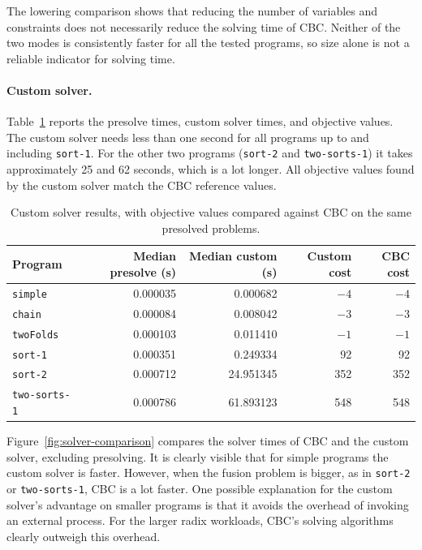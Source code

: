 The lowering comparison shows that reducing the number of variables and constraints does not necessarily reduce the solving time of CBC.
Neither of the two modes is consistently faster for all the tested programs, so size alone is not a reliable indicator for solving time.

\FloatBarrier
\paragraph{Custom solver.}

Table~\ref{tab:custom-results} reports the presolve times, custom solver times, and objective values.
The custom solver needs less than one second for all programs up to and including \texttt{sort-1}.
For the other two programs (\texttt{sort-2} and \texttt{two-sorts-1}) it takes approximately 25 and 62 seconds, which is a lot longer.
All objective values found by the custom solver match the CBC reference values.

\begin{table}[htbp]
    \centering
    \small
    \begin{tabular}{lrrrr}
        \hline
        Program & Median presolve (s) & Median custom (s)
                & Custom cost & CBC cost \\
        \hline
        \texttt{simple}      & 0.000035 & 0.000682  & $-4$ & $-4$ \\
        \texttt{chain}       & 0.000084 & 0.008042  & $-3$ & $-3$ \\
        \texttt{twoFolds}    & 0.000103 & 0.011410  & $-1$ & $-1$ \\
        \texttt{sort-1}      & 0.000351 & 0.249334  & 92   & 92 \\
        \texttt{sort-2}      & 0.000712 & 24.951345 & 352  & 352 \\
        \texttt{two-sorts-1} & 0.000786 & 61.893123 & 548  & 548 \\
        \hline
    \end{tabular}
    \caption{Custom solver results, with objective values
        compared against CBC on the same presolved problems.}
    \label{tab:custom-results}
\end{table}

\begin{samepage}
Figure~\ref{fig:solver-comparison} compares the solver times of CBC and the custom solver, excluding presolving.
It is clearly visible that for simple programs the custom solver is faster.
However, when the fusion problem is bigger, as in \texttt{sort-2} or \texttt{two-sorts-1}, CBC is a lot faster.
One possible explanation for the custom solver's advantage on smaller programs is that it avoids the overhead of invoking an external process.
For the larger radix workloads, CBC's solving algorithms clearly outweigh this overhead.
\par
\end{samepage}


\FloatBarrier
